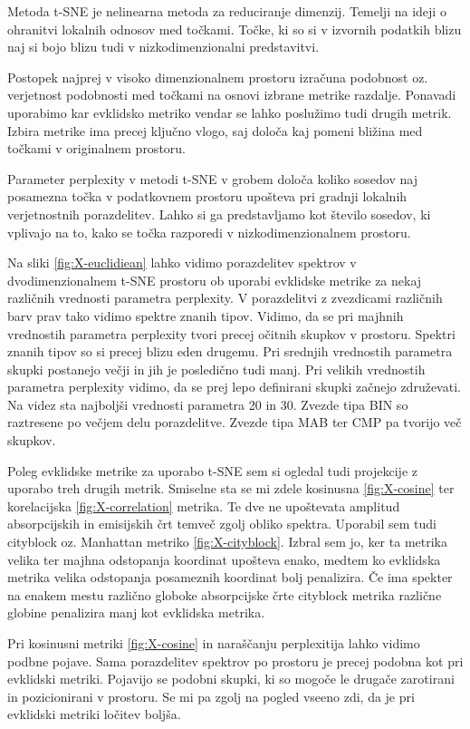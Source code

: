 \documentclass[slovene,11pt,a4paper]{article}
\begin{document}
Metoda t-SNE je nelinearna metoda za reduciranje dimenzij. Temelji na ideji o ohranitvi lokalnih odnosov med točkami. Točke, ki so si v izvornih podatkih blizu naj si bojo blizu tudi v nizkodimenzionalni predstavitvi.

Postopek najprej v visoko dimenzionalnem prostoru izračuna podobnost oz. verjetnost podobnosti med točkami na osnovi izbrane metrike razdalje. Ponavadi uporabimo kar evklidsko metriko vendar se lahko poslužimo tudi drugih metrik. Izbira metrike ima precej ključno vlogo, saj določa kaj pomeni bližina med točkami v originalnem prostoru.

Parameter perplexity v metodi t-SNE v grobem določa koliko sosedov naj posamezna točka v podatkovnem prostoru upošteva pri gradnji lokalnih verjetnostnih porazdelitev. Lahko si ga predstavljamo kot število sosedov, ki vplivajo na to, kako se točka razporedi v nizkodimenzionalnem prostoru.

Na sliki \ref{fig:X-euclidiean} lahko vidimo porazdelitev spektrov v dvodimenzionalnem t-SNE prostoru ob uporabi evklidske metrike za nekaj različnih vrednosti parametra perplexity. V porazdelitvi z zvezdicami različnih barv prav tako vidimo spektre znanih tipov. Vidimo, da se pri majhnih vrednostih parametra perplexity tvori precej očitnih skupkov v prostoru. Spektri znanih tipov so si precej blizu eden drugemu. Pri srednjih vrednostih parametra skupki postanejo večji in jih je posledično tudi manj. Pri velikih vrednostih parametra perplexity vidimo, da se prej lepo definirani skupki začnejo združevati. Na videz sta najboljši vrednosti parametra 20 in 30. Zvezde tipa BIN so raztresene po večjem delu porazdelitve. Zvezde tipa MAB ter CMP pa tvorijo več skupkov.

Poleg evklidske metrike za uporabo t-SNE sem si ogledal tudi projekcije z uporabo treh drugih metrik. Smiselne sta se mi zdele kosinusna \ref{fig:X-cosine} ter korelacijska \ref{fig:X-correlation} metrika. Te dve ne upoštevata amplitud absorpcijskih in emisijskih črt temveč zgolj obliko spektra. Uporabil sem tudi cityblock oz. Manhattan metriko \ref{fig:X-cityblock}. Izbral sem jo, ker ta metrika velika ter majhna odstopanja koordinat upošteva enako, medtem ko evklidska metrika velika odstopanja posameznih koordinat bolj penalizira. Če ima spekter na enakem mestu različno globoke absorpcijske črte cityblock metrika različne globine penalizira manj kot evklidska metrika.

Pri kosinusni metriki \ref{fig:X-cosine} in naraščanju perplexitija lahko vidimo podbne pojave. Sama porazdelitev spektrov po prostoru je precej podobna kot pri evklidski metriki. Pojavijo se podobni skupki, ki so mogoče le drugače zarotirani in pozicionirani v prostoru. Se mi pa zgolj na pogled vseeno zdi, da je pri evklidski metriki ločitev boljša.
\end{document}
